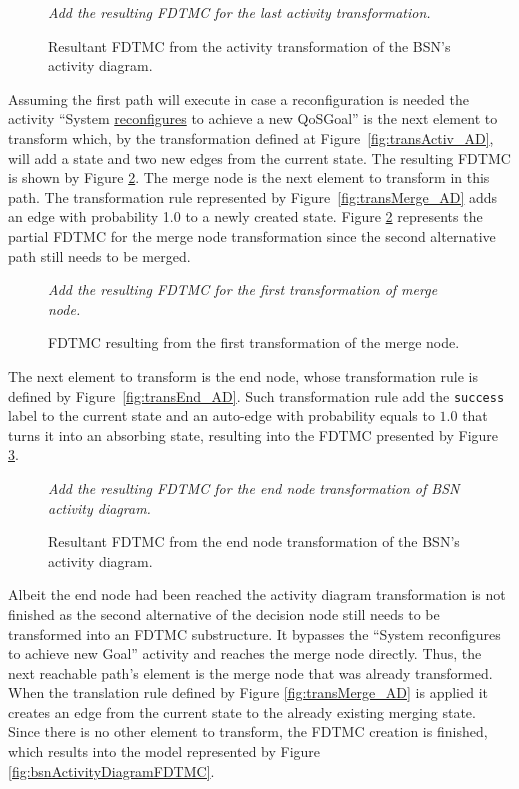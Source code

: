 \begin{figure}[h!]
\centering
\textit{Add the resulting FDTMC for the last activity transformation.}
\caption{Resultant FDTMC from the activity transformation of the BSN's
activity diagram.} 
\label{fig:resultDecisionNodeFDTMC}
\end{figure}


Assuming the first path will execute in case a reconfiguration is needed the
activity ``System \underline{reconfigures} to achieve a new QoSGoal'' is the next element to
transform which, by the transformation defined at
Figure~\ref{fig:transActiv_AD}, will add a state and two new edges from the
current state. The resulting FDTMC is shown by Figure
\ref{fig:firstResultingMergeNodeFDTMC}. The merge node is the next element to
transform in this path. The transformation rule represented by
Figure~\ref{fig:transMerge_AD} adds an edge with probability 1.0 to a newly
created state. Figure \ref{fig:firstResultingMergeNodeFDTMC} represents the
partial FDTMC for the merge node transformation since the second alternative
path still needs to be merged. 

\begin{figure}[h!]
\centering
\textit{Add the resulting FDTMC for the first transformation of merge node.}
\caption{FDTMC resulting from the first transformation of the merge node.} 
\label{fig:firstResultingMergeNodeFDTMC}
\end{figure}

The next element to transform is the end node, whose transformation rule is
defined by Figure~\ref{fig:transEnd_AD}. Such transformation rule add the
\texttt{success} label to the current state and an auto-edge with probability
equals to $1.0$ that turns it into an absorbing state, resulting into the FDTMC
presented by Figure \ref{fig:resultEndNodeFDTMC}.

\begin{figure}[h!]
\centering
\textit{Add the resulting FDTMC for the end node transformation of BSN activity
diagram.}
\caption{Resultant FDTMC from the end node transformation of the BSN's
activity diagram.} 
\label{fig:resultEndNodeFDTMC}
\end{figure}

Albeit the end node had been reached the activity diagram transformation is not
finished as the second alternative of the decision node still needs to be
transformed into an FDTMC substructure. It bypasses the ``System reconfigures to
achieve new Goal'' activity and reaches the merge node directly. Thus, the next
reachable path's element is the merge node that was already transformed.  When
the translation rule defined by Figure \ref{fig:transMerge_AD} is applied it
creates an edge from the current state to the already existing merging state.
Since there is no other element to transform, the FDTMC creation is finished,
which results into the model represented by Figure
\ref{fig:bsnActivityDiagramFDTMC}. 

